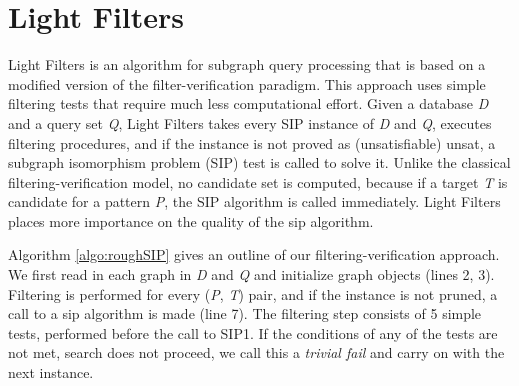\documentclass{l4proj}
\begin{document}



\chapter{Light Filters}
\label{ch:sip1}

Light Filters is an algorithm for subgraph query processing that is based on a modified version of the filter-verification paradigm. This approach uses simple filtering tests that require much less computational effort. 
Given a database \emph{D} and a query set \emph{Q}, Light Filters takes every SIP instance of \emph{D} and \emph{Q}, executes filtering procedures, and if the instance is not proved as (unsatisfiable) \gls{unsat}, a subgraph isomorphism problem (SIP) test is called to solve it. Unlike the classical filtering-verification model, no candidate set is computed, because if a target \emph{T} is candidate for a pattern \emph{P}, the SIP algorithm is called immediately. Light Filters places more importance on the quality of the \gls{sip} algorithm. 

Algorithm \ref{algo:roughSIP} gives an outline of our filtering-verification approach. We first read in each graph in \emph{D} and \emph{Q} and initialize graph objects (lines 2, 3). Filtering is performed for every (\emph{P}, \emph{T}) pair,  and if the instance is not pruned, a call to a \gls{sip} algorithm is made (line 7). The filtering step consists of 5 simple tests, performed before the call to SIP1. If the conditions of any of the tests are not met, search does not proceed, we call this a \emph{trivial fail} and carry on with the next instance. 
\end{document}
